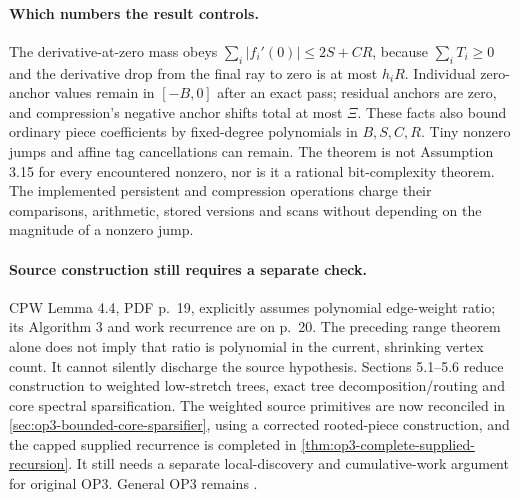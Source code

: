 \paragraph{Which numbers the result controls.}
The derivative-at-zero mass obeys
$\sum_i|f_i'(0)|\leq2S+CR$, because $\sum_iT_i\geq0$ and the
derivative drop from the final ray to zero is at most $h_iR$.
Individual zero-anchor values remain in $[-B,0]$ after an exact pass;
residual anchors are zero, and compression's negative anchor shifts
total at most $\Xi$. These facts also bound ordinary piece coefficients
by fixed-degree polynomials in $B,S,C,R$. Tiny nonzero jumps and affine
tag cancellations can remain. The theorem is not Assumption 3.15 for
every encountered nonzero, nor is it a rational bit-complexity theorem.
The implemented persistent and compression operations charge their
comparisons, arithmetic, stored versions and scans without depending on
the magnitude of a nonzero jump.

\paragraph{Source construction still requires a separate check.}
CPW Lemma 4.4, PDF p.~19, explicitly assumes polynomial edge-weight
ratio; its Algorithm 3 and work recurrence are on p.~20. The preceding
range theorem alone does not imply that ratio is polynomial in the
current, shrinking vertex count. It cannot silently discharge the source
hypothesis. Sections 5.1--5.6 reduce construction to weighted low-stretch
trees, exact tree decomposition/routing and core spectral sparsification.
The weighted source primitives are now reconciled in
\cref{sec:op3-bounded-core-sparsifier}, using a corrected rooted-piece
construction, and the capped supplied recurrence is completed in
\cref{thm:op3-complete-supplied-recursion}. It still needs a separate
local-discovery and cumulative-work argument for original OP3.
General OP3 remains \statusopen.
